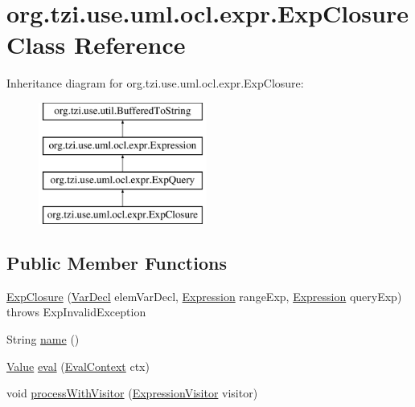 \hypertarget{classorg_1_1tzi_1_1use_1_1uml_1_1ocl_1_1expr_1_1_exp_closure}{\section{org.\-tzi.\-use.\-uml.\-ocl.\-expr.\-Exp\-Closure Class Reference}
\label{classorg_1_1tzi_1_1use_1_1uml_1_1ocl_1_1expr_1_1_exp_closure}
}
Inheritance diagram for org.\-tzi.\-use.\-uml.\-ocl.\-expr.\-Exp\-Closure\-:\begin{figure}[H]
\begin{center}
\leavevmode
\includegraphics[height=4.000000cm]{classorg_1_1tzi_1_1use_1_1uml_1_1ocl_1_1expr_1_1_exp_closure}
\end{center}
\end{figure}
\subsection*{Public Member Functions}
\begin{DoxyCompactItemize}
\item 
\hyperlink{classorg_1_1tzi_1_1use_1_1uml_1_1ocl_1_1expr_1_1_exp_closure_a223f97f92aa72ed34d67ca0129623f7c}{Exp\-Closure} (\hyperlink{classorg_1_1tzi_1_1use_1_1uml_1_1ocl_1_1expr_1_1_var_decl}{Var\-Decl} elem\-Var\-Decl, \hyperlink{classorg_1_1tzi_1_1use_1_1uml_1_1ocl_1_1expr_1_1_expression}{Expression} range\-Exp, \hyperlink{classorg_1_1tzi_1_1use_1_1uml_1_1ocl_1_1expr_1_1_expression}{Expression} query\-Exp)  throws Exp\-Invalid\-Exception 
\item 
String \hyperlink{classorg_1_1tzi_1_1use_1_1uml_1_1ocl_1_1expr_1_1_exp_closure_a871fd24952a3777ca15c27e3ebbf2ed2}{name} ()
\item 
\hyperlink{classorg_1_1tzi_1_1use_1_1uml_1_1ocl_1_1value_1_1_value}{Value} \hyperlink{classorg_1_1tzi_1_1use_1_1uml_1_1ocl_1_1expr_1_1_exp_closure_aa30c49638f797aa75cbfb6aa03fc0fb2}{eval} (\hyperlink{classorg_1_1tzi_1_1use_1_1uml_1_1ocl_1_1expr_1_1_eval_context}{Eval\-Context} ctx)
\item 
void \hyperlink{classorg_1_1tzi_1_1use_1_1uml_1_1ocl_1_1expr_1_1_exp_closure_ac423b2544451679acb038b8d4e21b658}{process\-With\-Visitor} (\hyperlink{interfaceorg_1_1tzi_1_1use_1_1uml_1_1ocl_1_1expr_1_1_expression_visitor}{Expression\-Visitor} visitor)
\end{DoxyCompactItemize}
